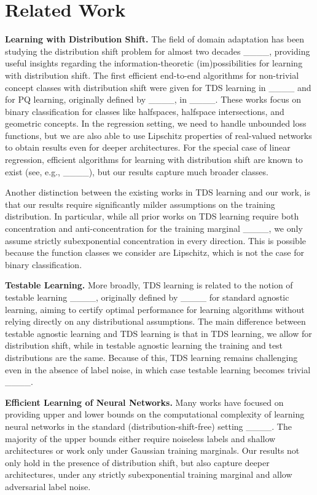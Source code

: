 \section{Related Work}
\noindent\textbf{Learning with Distribution Shift.} The field of domain adaptation has been studying the distribution shift problem for almost two decades ____, providing useful insights regarding the information-theoretic (im)possibilities for learning with distribution shift. The first efficient end-to-end algorithms for non-trivial concept classes with distribution shift were given for TDS learning in ____ and for PQ learning, originally defined by ____, in ____. These works focus on binary classification for classes like halfspaces, halfspace intersections, and geometric concepts. In the regression setting, we need to handle unbounded loss functions, but we are also able to use Lipschitz properties of real-valued networks to obtain results even for deeper architectures. For the special case of linear regression, efficient algorithms for learning with distribution shift are known to exist (see, e.g., ____), but our results capture much broader classes. 

Another distinction between the existing works in TDS learning and our work, is that our results require significantly milder assumptions on the training distribution. In particular, while all prior works on TDS learning require both concentration and anti-concentration for the training marginal ____, we only assume strictly subexponential concentration in every direction. This is possible because the function classes we consider are Lipschitz, which is not the case for binary classification.

\noindent\textbf{Testable Learning.} More broadly, TDS learning is related to the notion of testable learning ____, originally defined by ____ for standard agnostic learning, aiming to certify optimal performance for learning algorithms without relying directly on any distributional assumptions. The main difference between testable agnostic learning and TDS learning is that in TDS learning, we allow for distribution shift, while in testable agnostic learning the training and test distributions are the same. Because of this, TDS learning remains challenging even in the absence of label noise, in which case testable learning becomes trivial ____.


\noindent\textbf{Efficient Learning of Neural Networks.} Many works have focused on providing upper and lower bounds on the computational complexity of learning neural networks in the standard (distribution-shift-free) setting ____. The majority of the upper bounds either require noiseless labels and shallow architectures or work only under Gaussian training marginals. Our results not only hold in the presence of distribution shift, but also capture deeper architectures, under any strictly subexponential training marginal and allow adversarial label noise.

